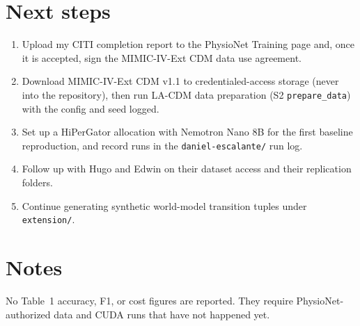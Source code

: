 \documentclass[11pt,letterpaper]{article}
\begin{document}
\section{Next steps}
\begin{enumerate}
  \item Upload my CITI completion report to the PhysioNet Training page and, once it is accepted, sign the MIMIC-IV-Ext CDM data use agreement.
  \item Download MIMIC-IV-Ext CDM v1.1 to credentialed-access storage (never into the repository), then run LA-CDM data preparation (S2 \texttt{prepare\_data}) with the config and seed logged.
  \item Set up a HiPerGator allocation with Nemotron Nano 8B for the first baseline reproduction, and record runs in the \texttt{daniel-escalante/} run log.
  \item Follow up with Hugo and Edwin on their dataset access and their replication folders.
  \item Continue generating synthetic world-model transition tuples under \texttt{extension/}.
\end{enumerate}

\section*{Notes}
No Table~1 accuracy, F1, or cost figures are reported. They require PhysioNet-authorized data and CUDA runs that have not happened yet.
\end{document}
